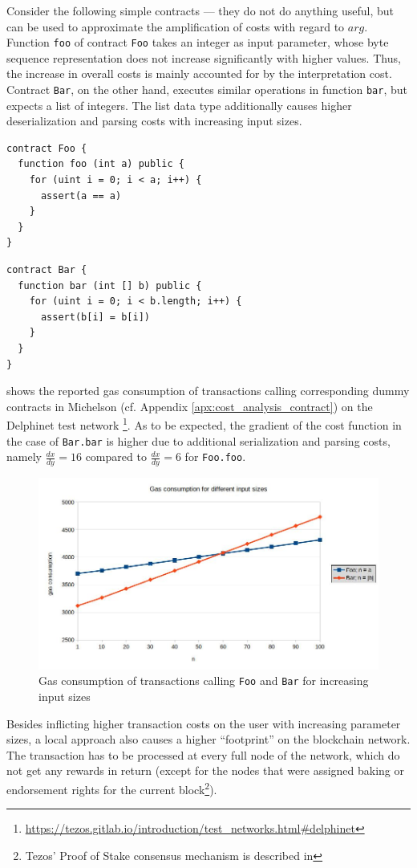 Consider the following simple contracts --- they do not do anything useful, but can be used to approximate the amplification of costs with regard to $arg$. Function \texttt{foo} of contract \texttt{Foo} takes an integer as input parameter, whose byte sequence representation does not increase significantly with higher values. Thus, the increase in overall costs is mainly accounted for by the interpretation cost. Contract \texttt{Bar}, on the other hand, executes similar operations in function \texttt{bar}, but expects a list of integers. The list data type additionally causes higher deserialization and parsing costs with increasing input sizes. 
\begin{lstlisting}[numbers=none, language=Solidity, caption=Simple dummy contract executing a loop]
contract Foo {
  function foo (int a) public {
    for (uint i = 0; i < a; i++) {
      assert(a == a)
    }
  }
}
\end{lstlisting}
\begin{lstlisting}[numbers=none, language=Solidity, caption=Simple dummy contract iterating over a list]
contract Bar {
  function bar (int [] b) public {
    for (uint i = 0; i < b.length; i++) {
      assert(b[i] = b[i])
    }
  }
}
\end{lstlisting}

 shows the reported gas consumption of transactions calling corresponding dummy contracts in Michelson (cf. Appendix \ref{apx:cost_analysis_contract}) on the Delphinet test network \footnote{\url{https://tezos.gitlab.io/introduction/test_networks.html\#delphinet}}. As to be expected, the gradient of the cost function in the case of \texttt{Bar.bar} is higher due to additional serialization and parsing costs, namely $\frac{dx}{dy} = 16$ compared to $\frac{dx}{dy} = 6$ for \texttt{Foo.foo}.
\begin{figure}[h]
\centering
\includegraphics[width=0.9\linewidth]{figures/2-use_cases/cost_analysis}
\caption{Gas consumption of transactions calling \texttt{Foo} and \texttt{Bar} for increasing input sizes}
\label{fig:use_case_cost}
\end{figure}


Besides inflicting higher transaction costs on the user with increasing parameter sizes, a local approach also causes a higher ``footprint'' on the blockchain network. The transaction has to be processed at every full node of the network, which do not get any rewards in return (except for the nodes that were assigned baking or endorsement rights for the current block\footnote{Tezos' Proof of Stake consensus mechanism is described in }).
